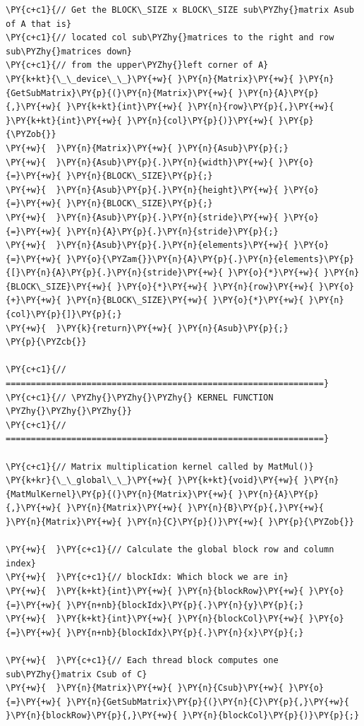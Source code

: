 \begin{Verbatim}[label=\makebox{\url{https://github.com/lucabaldini/cmepda/tree/master/slides/latex/snippets/MatrixMultiplication_shared.cu}},commandchars=\\\{\}]
\PY{c+c1}{// Get the BLOCK\_SIZE x BLOCK\_SIZE sub\PYZhy{}matrix Asub of A that is}
\PY{c+c1}{// located col sub\PYZhy{}matrices to the right and row sub\PYZhy{}matrices down}
\PY{c+c1}{// from the upper\PYZhy{}left corner of A}
\PY{k+kt}{\_\_device\_\_}\PY{+w}{ }\PY{n}{Matrix}\PY{+w}{ }\PY{n}{GetSubMatrix}\PY{p}{(}\PY{n}{Matrix}\PY{+w}{ }\PY{n}{A}\PY{p}{,}\PY{+w}{ }\PY{k+kt}{int}\PY{+w}{ }\PY{n}{row}\PY{p}{,}\PY{+w}{ }\PY{k+kt}{int}\PY{+w}{ }\PY{n}{col}\PY{p}{)}\PY{+w}{ }\PY{p}{\PYZob{}}
\PY{+w}{  }\PY{n}{Matrix}\PY{+w}{ }\PY{n}{Asub}\PY{p}{;}
\PY{+w}{  }\PY{n}{Asub}\PY{p}{.}\PY{n}{width}\PY{+w}{ }\PY{o}{=}\PY{+w}{ }\PY{n}{BLOCK\_SIZE}\PY{p}{;}
\PY{+w}{  }\PY{n}{Asub}\PY{p}{.}\PY{n}{height}\PY{+w}{ }\PY{o}{=}\PY{+w}{ }\PY{n}{BLOCK\_SIZE}\PY{p}{;}
\PY{+w}{  }\PY{n}{Asub}\PY{p}{.}\PY{n}{stride}\PY{+w}{ }\PY{o}{=}\PY{+w}{ }\PY{n}{A}\PY{p}{.}\PY{n}{stride}\PY{p}{;}
\PY{+w}{  }\PY{n}{Asub}\PY{p}{.}\PY{n}{elements}\PY{+w}{ }\PY{o}{=}\PY{+w}{ }\PY{o}{\PYZam{}}\PY{n}{A}\PY{p}{.}\PY{n}{elements}\PY{p}{[}\PY{n}{A}\PY{p}{.}\PY{n}{stride}\PY{+w}{ }\PY{o}{*}\PY{+w}{ }\PY{n}{BLOCK\_SIZE}\PY{+w}{ }\PY{o}{*}\PY{+w}{ }\PY{n}{row}\PY{+w}{ }\PY{o}{+}\PY{+w}{ }\PY{n}{BLOCK\_SIZE}\PY{+w}{ }\PY{o}{*}\PY{+w}{ }\PY{n}{col}\PY{p}{]}\PY{p}{;}
\PY{+w}{  }\PY{k}{return}\PY{+w}{ }\PY{n}{Asub}\PY{p}{;}
\PY{p}{\PYZcb{}}

\PY{c+c1}{// ===============================================================}
\PY{c+c1}{// \PYZhy{}\PYZhy{}\PYZhy{} KERNEL FUNCTION \PYZhy{}\PYZhy{}\PYZhy{}}
\PY{c+c1}{// ===============================================================}

\PY{c+c1}{// Matrix multiplication kernel called by MatMul()}
\PY{k+kr}{\_\_global\_\_}\PY{+w}{ }\PY{k+kt}{void}\PY{+w}{ }\PY{n}{MatMulKernel}\PY{p}{(}\PY{n}{Matrix}\PY{+w}{ }\PY{n}{A}\PY{p}{,}\PY{+w}{ }\PY{n}{Matrix}\PY{+w}{ }\PY{n}{B}\PY{p}{,}\PY{+w}{ }\PY{n}{Matrix}\PY{+w}{ }\PY{n}{C}\PY{p}{)}\PY{+w}{ }\PY{p}{\PYZob{}}

\PY{+w}{  }\PY{c+c1}{// Calculate the global block row and column index}
\PY{+w}{  }\PY{c+c1}{// blockIdx: Which block we are in}
\PY{+w}{  }\PY{k+kt}{int}\PY{+w}{ }\PY{n}{blockRow}\PY{+w}{ }\PY{o}{=}\PY{+w}{ }\PY{n+nb}{blockIdx}\PY{p}{.}\PY{n}{y}\PY{p}{;}
\PY{+w}{  }\PY{k+kt}{int}\PY{+w}{ }\PY{n}{blockCol}\PY{+w}{ }\PY{o}{=}\PY{+w}{ }\PY{n+nb}{blockIdx}\PY{p}{.}\PY{n}{x}\PY{p}{;}

\PY{+w}{  }\PY{c+c1}{// Each thread block computes one sub\PYZhy{}matrix Csub of C}
\PY{+w}{  }\PY{n}{Matrix}\PY{+w}{ }\PY{n}{Csub}\PY{+w}{ }\PY{o}{=}\PY{+w}{ }\PY{n}{GetSubMatrix}\PY{p}{(}\PY{n}{C}\PY{p}{,}\PY{+w}{ }\PY{n}{blockRow}\PY{p}{,}\PY{+w}{ }\PY{n}{blockCol}\PY{p}{)}\PY{p}{;}


\end{Verbatim}
